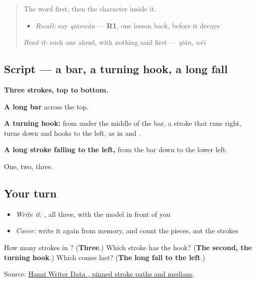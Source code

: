 \begin{quote}
The word first, then the character inside it.

\begin{itemize}
\raggedright
  \item \emph{Recall:} say \emph{qiānwàn} — \textbf{R1}, one lesson back, before it decays
\end{itemize}

\begin{quote}
 
\end{quote}

\emph{Read it:} each one aloud, with nothing said first — \emph{qiān}, \emph{wéi}
\end{quote}

\subsection*{Script — a bar, a turning hook, a long fall}

\begin{quote}
\end{quote}

\textbf{Three strokes, top to bottom.}

\textbf{A long bar} across the top.

\textbf{A turning hook:} from under the middle of the bar, a stroke that runs right, turns down and hooks to the left, as in  and .

\textbf{A long stroke falling to the left,} from the bar down to the lower left.

One, two, three.

\subsection*{Your turn}
\begin{itemize}
\raggedright
  \item \emph{Write it:} , all three, with the model in front of you
  \item \emph{Cover:} write it again from memory, and count the pieces, not the strokes
\end{itemize}

\begin{tcolorbox}[breakable,colback=teal!4,colframe=teal!35!black,title={Before you move on}]
How many strokes in ? (\textbf{Three}.) Which stroke has the hook? (\textbf{The second, the turning hook}.) Which comes last? (\textbf{The long fall to the left}.)

Source: \href{https://raw.githubusercontent.com/chanind/hanzi-writer-data/68d10a4b21150cae5e1ebbd223eed289cf32d90c/data/\%E4\%B8\%87.json}{Hanzi Writer Data , pinned stroke paths and medians}.
\end{tcolorbox}
